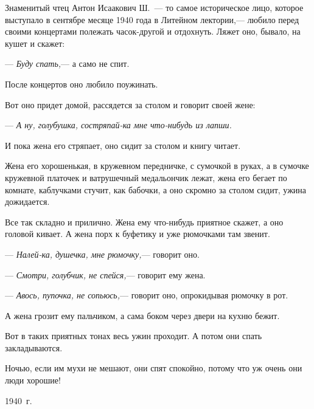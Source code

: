 Знаменитый чтец Антон Исаакович Ш.~--- то самое историческое лицо, которое выступало в сентябре месяце 1940 года в Литейном лектории,--- любило перед своими концертами полежать часок-другой и отдохнуть. Ляжет оно, бывало, на кушет и скажет:

--- \textit{Буду спать,}--- а само не спит.

После концертов оно любило поужинать.

Вот оно придет домой, рассядется за столом и говорит своей жене:

--- \textit{А ну, голубушка, состряпай-ка мне что-нибудь из лапши.}

И пока жена его стряпает, оно сидит за столом и книгу читает.

Жена его хорошенькая, в кружевном передничке, с сумочкой в руках, а в сумочке кружевной платочек и ватрушечный медальончик лежат, жена его бегает по комнате, каблучками стучит, как бабочки, а оно скромно за столом сидит, ужина дожидается.

Все так складно и прилично. Жена ему что-нибудь приятное скажет, а оно головой кивает. А жена порх к буфетику и уже рюмочками там звенит.

--- \textit{Налей-ка, душечка, мне рюмочку,}--- говорит оно.

--- \textit{Смотри, голубчик, не спейся,}--- говорит ему жена.

--- \textit{Авось, пупочка, не сопьюсь,}--- говорит оно, опрокидывая рюмочку в рот.

А жена грозит ему пальчиком, а сама боком через двери на кухню бежит.

Вот в таких приятных тонах весь ужин проходит. А потом они спать закладываются.

Ночью, если им мухи не мешают, они спят спокойно, потому что уж очень они люди хорошие!

\begin{flushright}
1940~г.
\end{flushright}